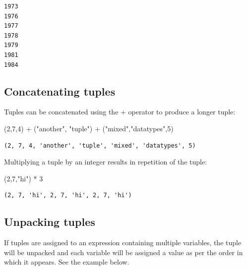 \documentclass[
  letterpaper,
  DIV=11,
  numbers=noendperiod]{scrreprt}
\newenvironment{Shaded}{\begin{snugshade}}{\end{snugshade}}
\newcommand{\DecValTok}[1]{\textcolor[rgb]{0.68,0.00,0.00}{#1}}
\newcommand{\NormalTok}[1]{\textcolor[rgb]{0.00,0.23,0.31}{#1}}
\newcommand{\OperatorTok}[1]{\textcolor[rgb]{0.37,0.37,0.37}{#1}}
\newcommand{\StringTok}[1]{\textcolor[rgb]{0.13,0.47,0.30}{#1}}
\begin{document}
\begin{verbatim}
1973
1976
1977
1978
1979
1981
1984
\end{verbatim}

\hypertarget{concatenating-tuples}{%
\subsection{Concatenating tuples}\label{concatenating-tuples}}

Tuples can be concatenated using the + operator to produce a longer
tuple:

\begin{Shaded}
\begin{Highlighting}[]
\NormalTok{(}\DecValTok{2}\NormalTok{,}\DecValTok{7}\NormalTok{,}\DecValTok{4}\NormalTok{) }\OperatorTok{+}\NormalTok{ (}\StringTok{"another"}\NormalTok{, }\StringTok{"tuple"}\NormalTok{) }\OperatorTok{+}\NormalTok{ (}\StringTok{"mixed"}\NormalTok{,}\StringTok{"datatypes"}\NormalTok{,}\DecValTok{5}\NormalTok{)}
\end{Highlighting}
\end{Shaded}

\begin{verbatim}
(2, 7, 4, 'another', 'tuple', 'mixed', 'datatypes', 5)
\end{verbatim}

Multiplying a tuple by an integer results in repetition of the tuple:

\begin{Shaded}
\begin{Highlighting}[]
\NormalTok{(}\DecValTok{2}\NormalTok{,}\DecValTok{7}\NormalTok{,}\StringTok{"hi"}\NormalTok{) }\OperatorTok{*} \DecValTok{3}
\end{Highlighting}
\end{Shaded}

\begin{verbatim}
(2, 7, 'hi', 2, 7, 'hi', 2, 7, 'hi')
\end{verbatim}

\hypertarget{unpacking-tuples}{%
\subsection{Unpacking tuples}\label{unpacking-tuples}}

If tuples are assigned to an expression containing multiple variables,
the tuple will be unpacked and each variable will be assigned a value as
per the order in which it appears. See the example below.
\end{document}
